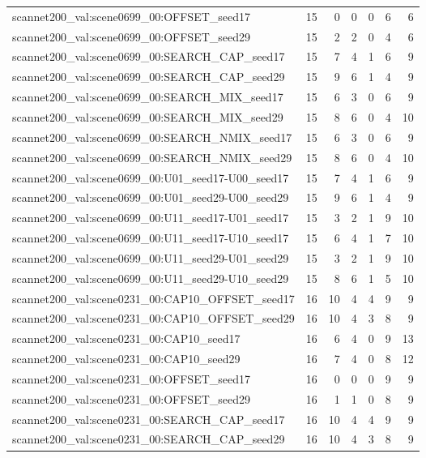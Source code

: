 \begin{table}[t]
\begin{tabular}{lrrrrrr}
scannet200\_val:scene0699\_00:OFFSET\_seed17 & 15 & 0 & 0 & 0 & 6 & 6 \\
scannet200\_val:scene0699\_00:OFFSET\_seed29 & 15 & 2 & 2 & 0 & 4 & 6 \\
scannet200\_val:scene0699\_00:SEARCH\_CAP\_seed17 & 15 & 7 & 4 & 1 & 6 & 9 \\
scannet200\_val:scene0699\_00:SEARCH\_CAP\_seed29 & 15 & 9 & 6 & 1 & 4 & 9 \\
scannet200\_val:scene0699\_00:SEARCH\_MIX\_seed17 & 15 & 6 & 3 & 0 & 6 & 9 \\
scannet200\_val:scene0699\_00:SEARCH\_MIX\_seed29 & 15 & 8 & 6 & 0 & 4 & 10 \\
scannet200\_val:scene0699\_00:SEARCH\_NMIX\_seed17 & 15 & 6 & 3 & 0 & 6 & 9 \\
scannet200\_val:scene0699\_00:SEARCH\_NMIX\_seed29 & 15 & 8 & 6 & 0 & 4 & 10 \\
scannet200\_val:scene0699\_00:U01\_seed17-U00\_seed17 & 15 & 7 & 4 & 1 & 6 & 9 \\
scannet200\_val:scene0699\_00:U01\_seed29-U00\_seed29 & 15 & 9 & 6 & 1 & 4 & 9 \\
scannet200\_val:scene0699\_00:U11\_seed17-U01\_seed17 & 15 & 3 & 2 & 1 & 9 & 10 \\
scannet200\_val:scene0699\_00:U11\_seed17-U10\_seed17 & 15 & 6 & 4 & 1 & 7 & 10 \\
scannet200\_val:scene0699\_00:U11\_seed29-U01\_seed29 & 15 & 3 & 2 & 1 & 9 & 10 \\
scannet200\_val:scene0699\_00:U11\_seed29-U10\_seed29 & 15 & 8 & 6 & 1 & 5 & 10 \\
scannet200\_val:scene0231\_00:CAP10\_OFFSET\_seed17 & 16 & 10 & 4 & 4 & 9 & 9 \\
scannet200\_val:scene0231\_00:CAP10\_OFFSET\_seed29 & 16 & 10 & 4 & 3 & 8 & 9 \\
scannet200\_val:scene0231\_00:CAP10\_seed17 & 16 & 6 & 4 & 0 & 9 & 13 \\
scannet200\_val:scene0231\_00:CAP10\_seed29 & 16 & 7 & 4 & 0 & 8 & 12 \\
scannet200\_val:scene0231\_00:OFFSET\_seed17 & 16 & 0 & 0 & 0 & 9 & 9 \\
scannet200\_val:scene0231\_00:OFFSET\_seed29 & 16 & 1 & 1 & 0 & 8 & 9 \\
scannet200\_val:scene0231\_00:SEARCH\_CAP\_seed17 & 16 & 10 & 4 & 4 & 9 & 9 \\
scannet200\_val:scene0231\_00:SEARCH\_CAP\_seed29 & 16 & 10 & 4 & 3 & 8 & 9 \\

\end{tabular}
\end{table}
